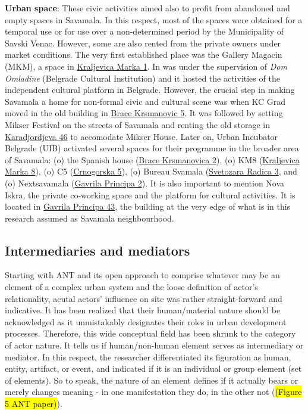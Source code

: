 \documentclass[11pt]{report}
\begin{document}
\begin{itemize}
\textbf{Urban space}:
These civic activities aimed also to profit from abandoned and empty spaces in Savamala.
In this respect, most of the spaces were obtained for a temporal use or for use over a non-determined period by the Municipality of Savski Venac.
However, some are also rented from the private owners under market conditions.
The very first established place was the Gallery Magacin (MKM), a space in \underline{Kraljevica Marka 1}.
In was under the supervision of \textit{Dom Omladine} (Belgrade Cultural Institution) and it hosted the activities of the independent cultural platform in Belgrade.
However, the crucial step in making Savamala a home for non-formal civic and cultural scene was when KC Grad moved in the old building in \underline{Brace Krsmanovic 5}.
It was followed by setting Mikser Festival on the streets of Savamala and renting the old storage in \underline{Karadjordjeva 46} to accomodate Mikser House. Later on, Urban Incubator Belgrade (UIB) activated several spaces for their programme in the broader area of Savamala:
(o) the Spanish house (\underline{Brace Krsmanovica 2}),
(o) KM8 (\underline{Kraljevica Marka 8}),
(o) C5 (\underline{Crnogorska 5}),
(o) Bureau Svamala (\underline{Svetozara Radica 3},
and
(o) Nextsavamala (\underline{Gavrila Principa 2}). 
It is also important to mention Nova Iskra, the private co-working space and the platform for cultural activities. It is located in \underline{Gavrila Principa 43}, the building at the very edge of what is in this research assumed as Savamala neighbourhood.
\end{itemize}
 
\subsection{Intermediaries and mediators}

Starting with ANT and its open approach to comprise whatever may be an element of a complex urban system and the loose definition of actor’s relationality, 
acutal actors’ influence on site was rather straight-forward and indicative.
It has been realized that their human/material nature should be acknowledged as it unmistakably designates their roles in urban development processes.
Therefore, this wide conceptual field has been shrunk to the category of actor nature.
It tells us if human/non-human element serves as intermediary or mediator.
In this respect, the researcher differentiated its figuration as human, entity, artifact, or event, and  indicated if it is an individual or group element (set of elements).
So to speak, the nature of an element defines if it actually bears or merely changes meaning - in one manifestation they do, in the other not (\hl{(Figure 5 ANT paper)}).
\end{document}
